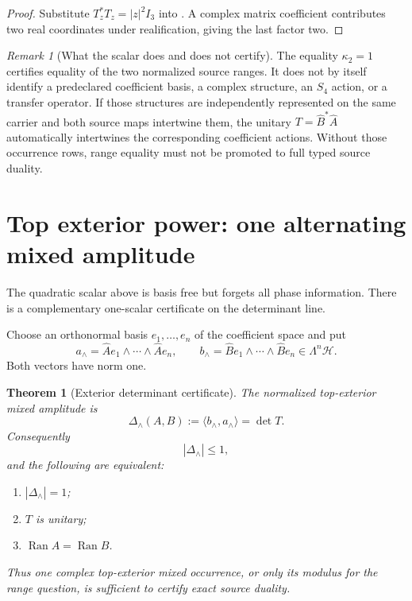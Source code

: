 \documentclass[11pt]{article}
\newtheorem{theorem}{Theorem}[section]
\theoremstyle{definition}
\theoremstyle{remark}
\newtheorem{remark}[remark]{Remark}
\begin{document}
\begin{proof}
Substitute $T_z^*T_z=|z|^2I_3$ into
.  A complex matrix coefficient contributes
two real coordinates under realification, giving the last factor two.
\end{proof}

\begin{remark}[What the scalar does and does not certify]
The equality $\kappa_2=1$ certifies equality of the two normalized source
ranges.  It does not by itself identify a predeclared coefficient basis, a
complex structure, an $S_4$ action, or a transfer operator.  If those
structures are independently represented on the same carrier and both source
maps intertwine them, the unitary $T=\widehat B^*\widehat A$ automatically
intertwines the corresponding coefficient actions.  Without those occurrence
rows, range equality must not be promoted to full typed source duality.
\end{remark}

\section{Top exterior power: one alternating mixed amplitude}
\label{sec:v16-exterior}

The quadratic scalar above is basis free but forgets all phase information.
There is a complementary one-scalar certificate on the determinant line.

Choose an orthonormal basis $e_1,\ldots,e_n$ of the coefficient space and put
\[
 a_\wedge
 =\widehat A e_1\wedge\cdots\wedge\widehat A e_n,
 \qquad
 b_\wedge
 =\widehat B e_1\wedge\cdots\wedge\widehat B e_n
 \in\Lambda^n\mathcal H.
\]
Both vectors have norm one.

\begin{theorem}[Exterior determinant certificate]
\label{thm:v16-exterior-det}
The normalized top-exterior mixed amplitude is
\[
 \boxed{
 \Delta_\wedge(A,B)
 :=\langle b_\wedge,a_\wedge\rangle
 =\det T.}
 \tag{V16.4}
\]
Consequently
\[
 |\Delta_\wedge|\le1,
\]
and the following are equivalent:
\begin{enumerate}[label=\textup{(\roman*)},leftmargin=2.8em]
\item $|\Delta_\wedge|=1$;
\item $T$ is unitary;
\item $\operatorname{Ran}A=\operatorname{Ran}B$.
\end{enumerate}
Thus one complex top-exterior mixed occurrence, or only its modulus for the
range question, is sufficient to certify exact source duality.
\end{theorem}
\end{document}
